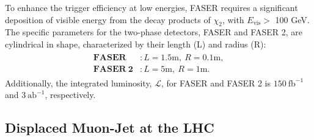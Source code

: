 \documentclass[preprint, superscriptaddress,amsmath, nofootinbib]{revtex4-1}
\begin{document}
To enhance the trigger efficiency at low energies, FASER requires a significant deposition of visible energy from the decay products of $\chi_2$, with ${E_{\text{vis}}} >$ 100 GeV. The specific parameters for the two-phase detectors, FASER and FASER 2, are cylindrical in shape, characterized by their length (L) and radius (R):
\begin{align}
\begin{split}
       \mathbf{FASER} &: L=1.5\text{m},\ R=0.1\text{m}, \\
       \mathbf{FASER\ 2} &: L=5\text{m},\ R=1\text{m}. 
\end{split}
\end{align}
Additionally, the integrated luminosity, $\mathcal{L}$, for FASER and FASER 2 is $150\ \text{fb}^{-1}$ and $3\ \text{ab}^{-1}$, respectively.

\subsection{Displaced Muon-Jet at the LHC}
\label{subsec:4b} 
\end{document}
